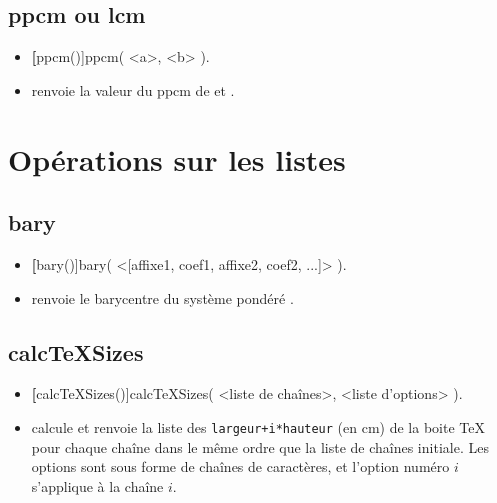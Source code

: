 \subsection{ppcm ou lcm}

\begin{itemize}
 \item \util \textbf[ppcm()]{ppcm( <a>, <b> )}.
 \item \desc renvoie la valeur du ppcm de  et .
\end{itemize}

\section{Opérations sur les listes}

\subsection{bary}
\begin{itemize}
 \item \util \textbf[bary()]{bary( <[affixe1, coef1, affixe2, coef2, ...]> )}.
 \item \desc renvoie le barycentre du système pondéré .
\end{itemize}

\subsection{calcTeXSizes}
\begin{itemize}
 \item \util \textbf[calcTeXSizes()]{calcTeXSizes( <liste de chaînes>, <liste d'options> )}.
 \item \desc calcule et renvoie la liste des \verb|largeur+i*hauteur| (en cm) de la boite TeX pour chaque chaîne dans le même ordre que la liste de chaînes initiale. Les options sont sous forme de chaînes de caractères, et l'option numéro $i$ s'applique à la chaîne $i$.
\end{itemize}

